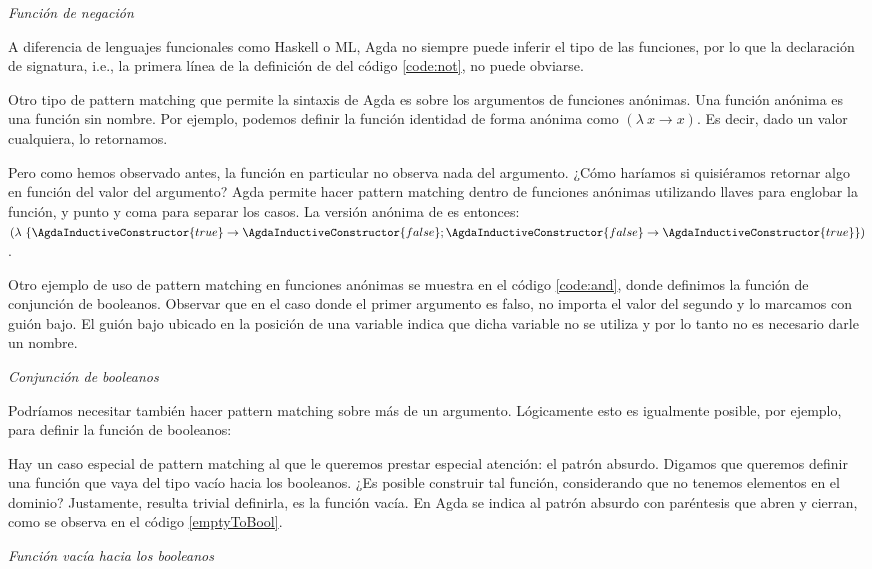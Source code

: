 \begin{agdacode}{\it Función de negación}\label{code:not}
  
\end{agdacode}

A diferencia de lenguajes funcionales como Haskell o ML, Agda no siempre puede inferir el tipo de las funciones, por lo que la declaración de signatura, i.e., la primera línea de la definición de  del código \ref{code:not}, no puede obviarse. 

Otro tipo de pattern matching que permite la sintaxis de Agda es sobre los argumentos de funciones anónimas. Una función anónima es una función sin nombre. Por ejemplo, podemos definir la función identidad de forma anónima como $(\lambda\ x \to x)$. Es decir, dado un valor cualquiera, lo retornamos.

Pero como hemos observado antes, la función  en particular no observa nada del argumento. ¿Cómo haríamos si quisiéramos retornar algo en función del valor del argumento? Agda permite hacer pattern matching dentro de funciones anónimas utilizando llaves para englobar la función, y punto y coma para separar los casos. La versión anónima de  es entonces: $(\lambda\ \{ \AgdaInductiveConstructor{true} \to \AgdaInductiveConstructor{false} ; \AgdaInductiveConstructor{false} \to \AgdaInductiveConstructor{true} \})$.

Otro ejemplo de uso de pattern matching en funciones anónimas se muestra en el código \ref{code:and}, donde definimos la función  de conjunción de booleanos. Observar que en el caso donde el primer argumento es falso, no importa el valor del segundo y lo marcamos con guión bajo. El guión bajo ubicado en la posición de una variable indica que dicha variable no se utiliza y por lo tanto no es necesario darle un nombre.  

\begin{agdacode}{\it Conjunción de booleanos}\label{code:and}
  
\end{agdacode}
Podríamos necesitar también hacer pattern matching sobre más de un argumento. Lógicamente esto es igualmente posible, por ejemplo, para definir la función  de booleanos:


Hay un caso especial de pattern matching al que le queremos prestar especial atención: el patrón absurdo. Digamos que queremos definir una función que vaya del tipo vacío hacia los booleanos. ¿Es posible construir tal función, considerando que no tenemos elementos en el dominio? Justamente, resulta trivial definirla, es la función vacía. En Agda se indica al patrón absurdo con paréntesis que abren y cierran, como se observa en el código \ref{emptyToBool}.
\begin{agdacode}{\it Función vacía hacia los booleanos}\label{emptyToBool}

\end{agdacode}

